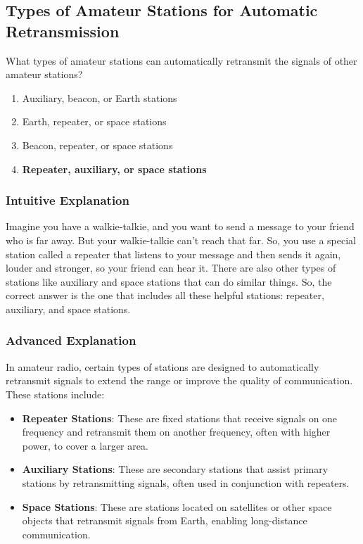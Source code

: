 \subsection{Types of Amateur Stations for Automatic Retransmission}
\label{T1D07}

\begin{tcolorbox}[colback=gray!10!white,colframe=black!75!black,title=T1D07]
What types of amateur stations can automatically retransmit the signals of other amateur stations?
\begin{enumerate}[label=\Alph*]
    \item Auxiliary, beacon, or Earth stations
    \item Earth, repeater, or space stations
    \item Beacon, repeater, or space stations
    \item \textbf{Repeater, auxiliary, or space stations}
\end{enumerate}
\end{tcolorbox}

\subsubsection{Intuitive Explanation}
Imagine you have a walkie-talkie, and you want to send a message to your friend who is far away. But your walkie-talkie can't reach that far. So, you use a special station called a repeater that listens to your message and then sends it again, louder and stronger, so your friend can hear it. There are also other types of stations like auxiliary and space stations that can do similar things. So, the correct answer is the one that includes all these helpful stations: repeater, auxiliary, and space stations.

\subsubsection{Advanced Explanation}
In amateur radio, certain types of stations are designed to automatically retransmit signals to extend the range or improve the quality of communication. These stations include:

\begin{itemize}
    \item \textbf{Repeater Stations}: These are fixed stations that receive signals on one frequency and retransmit them on another frequency, often with higher power, to cover a larger area.
    \item \textbf{Auxiliary Stations}: These are secondary stations that assist primary stations by retransmitting signals, often used in conjunction with repeaters.
    \item \textbf{Space Stations}: These are stations located on satellites or other space objects that retransmit signals from Earth, enabling long-distance communication.
\end{itemize}


